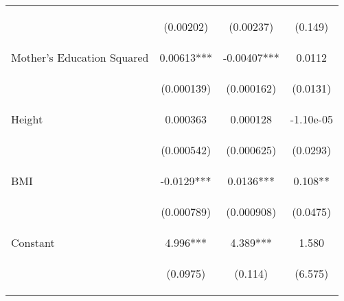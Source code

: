 \begin{table}[htpb!]
\begin{tabular}{lccc}
\vspace{4pt} & \begin{footnotesize}(0.00202)\end{footnotesize} & \begin{footnotesize}(0.00237)\end{footnotesize} & \begin{footnotesize}(0.149)\end{footnotesize} \\
Mother's Education Squared & 0.00613*** & -0.00407*** & 0.0112 \\
\vspace{4pt} & \begin{footnotesize}(0.000139)\end{footnotesize} & \begin{footnotesize}(0.000162)\end{footnotesize} & \begin{footnotesize}(0.0131)\end{footnotesize} \\
Height & 0.000363 & 0.000128 & -1.10e-05 \\
\vspace{4pt} & \begin{footnotesize}(0.000542)\end{footnotesize} & \begin{footnotesize}(0.000625)\end{footnotesize} & \begin{footnotesize}(0.0293)\end{footnotesize} \\
BMI & -0.0129*** & 0.0136*** & 0.108** \\
\vspace{4pt} & \begin{footnotesize}(0.000789)\end{footnotesize} & \begin{footnotesize}(0.000908)\end{footnotesize} & \begin{footnotesize}(0.0475)\end{footnotesize} \\
Constant & 4.996*** & 4.389*** & 1.580 \\
 & \begin{footnotesize}(0.0975)\end{footnotesize} & \begin{footnotesize}(0.114)\end{footnotesize}&\begin{footnotesize}(6.575)\end{footnotesize} \\

\end{tabular}
\end{table}
